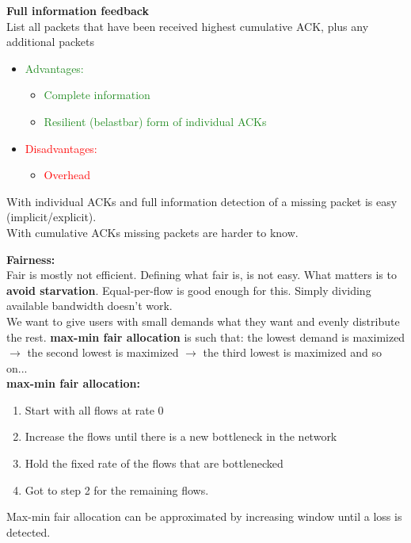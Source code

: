 \documentclass[a4paper, fontsize=8pt, landscape, DIV=1]{scrartcl}
\begin{document}
\begin{multicols*}{4}
   			\textbf{Full information feedback}\\
   			List all packets that have been received highest cumulative ACK, plus any additional packets
   			\vspace{-0.2cm}
   			\begin{itemize}[noitemsep]
   				\item \textcolor{ForestGreen}{Advantages:}
   				\begin{itemize}
   					\item \textcolor{ForestGreen}{Complete information}
   					\item \textcolor{ForestGreen}{Resilient (belastbar) form of individual ACKs}
   				\end{itemize}
   				\item \textcolor{red}{Disadvantages:}
   				\begin{itemize}
   					\item \textcolor{red}{Overhead}
   				\end{itemize} 
   			\end{itemize}
   			
   			With individual ACKs and full information detection of a missing packet is easy (implicit/explicit). \\
   			With cumulative ACKs missing packets are harder to know. \par
   			
   			\textbf{Fairness:}\\
   			Fair is mostly not efficient. Defining what fair is, is not easy. What matters is to \textbf{avoid starvation}. Equal-per-flow is good enough for this. Simply dividing available bandwidth doesn't work.\\
   			We want to give users with small demands what they want and evenly distribute the rest. \textbf{max-min fair allocation} is such that: the lowest demand is maximized $\rightarrow$ the second lowest is maximized $\rightarrow$ the third lowest is maximized and so on...\\
   			\textbf{max-min fair allocation:}
   			\begin{enumerate}[noitemsep]
   				\item Start with all flows at rate 0
   				\item Increase the flows until there is a new bottleneck in the network
   				\item Hold the fixed rate of the flows that are bottlenecked
   				\item Got to step 2 for the remaining flows. 	 
   			\end{enumerate}  
   			Max-min fair allocation can be approximated by increasing window until a loss is detected. \par
   			

\end{multicols*}
\end{document}
